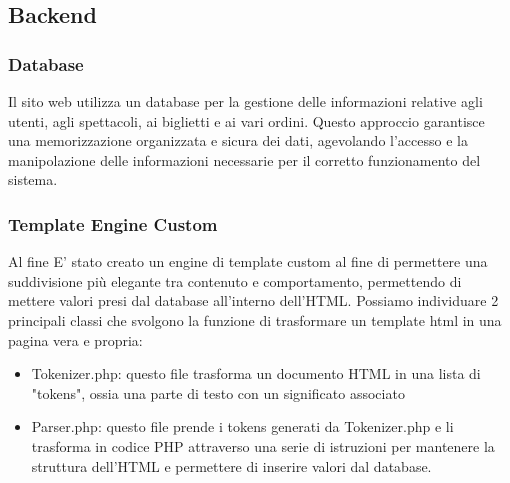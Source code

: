 \subsection{Backend}
\subsubsection{Database}
Il sito web utilizza un database per la gestione delle informazioni relative agli utenti, agli spettacoli, ai biglietti e ai vari ordini. Questo approccio garantisce una memorizzazione organizzata e sicura dei dati, agevolando l'accesso e la manipolazione delle informazioni necessarie per il corretto funzionamento del sistema.
\\
\begin{minipage}{0.3\textwidth}
     
\end{minipage}

\subsubsection{Template Engine Custom}
Al fine E' stato creato un engine di template custom al fine di permettere una suddivisione più elegante tra contenuto e comportamento, permettendo di mettere valori presi dal database all'interno dell'HTML.
Possiamo individuare 2 principali classi che svolgono la funzione di trasformare un template html in una pagina vera e propria:
\begin{itemize}
    \item Tokenizer.php: questo file trasforma un documento HTML in una lista di "tokens", ossia una parte di testo con un significato associato 
    \item Parser.php: questo file prende i tokens generati da Tokenizer.php e li trasforma in codice PHP attraverso una serie di istruzioni per mantenere la struttura dell'HTML e permettere di inserire valori dal database.
\end{itemize}

